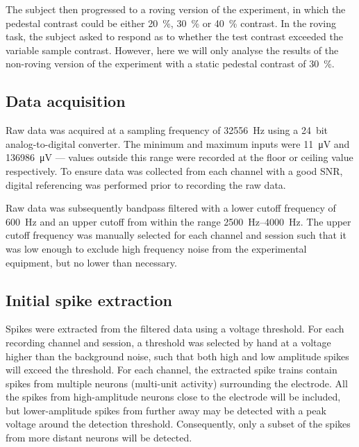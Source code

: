 The subject then progressed to a roving version of the experiment, in which the pedestal contrast could be either \SI{20}{\percent}, \SI{30}{\percent} or \SI{40}{\percent} contrast.
In the roving task, the subject asked to respond as to whether the test contrast exceeded the variable sample contrast.
However, here we will only analyse the results of the non-roving version of the experiment with a static pedestal contrast of \SI{30}{\percent}.


\subsection{Data acquisition}

Raw data was acquired at a sampling frequency of \SI{32556}{Hz} using a \SI{24}{bit} analog-to-digital converter.
The minimum and maximum inputs were \SI{11}{\micro\volt} and \SI{136986}{\micro\volt} --- values outside this range were recorded at the floor or ceiling value respectively.
To ensure data was collected from each channel with a good \ac{SNR}, digital referencing was performed prior to recording the raw data.

Raw data was subsequently bandpass filtered with a lower cutoff frequency of \SI{600}{Hz} and an upper cutoff from within the range \SIrange{2500}{4000}{Hz}.
The upper cutoff frequency was manually selected for each channel and session such that it was low enough to exclude high frequency noise from the experimental equipment, but no lower than necessary.


\subsection{Initial spike extraction}
\label{sec:pl_spike_extraction}

Spikes were extracted from the filtered data using a voltage threshold.
For each recording channel and session, a threshold was selected by hand at a voltage higher than the background noise, such that both high and low amplitude spikes will exceed the threshold.
For each channel, the extracted spike trains contain spikes from multiple neurons (multi-unit activity) surrounding the electrode.
All the spikes from high-amplitude neurons close to the electrode will be included, but lower-amplitude spikes from further away may be detected with a peak voltage around the detection threshold.
Consequently, only a subset of the spikes from more distant neurons will be detected.

